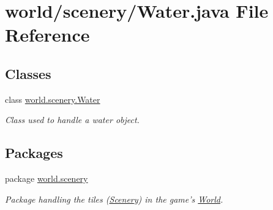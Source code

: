\hypertarget{a00077}{\section{world/scenery/\-Water.java File Reference}
\label{a00077}
}
\subsection*{Classes}
\begin{DoxyCompactItemize}
\item 
class \hyperlink{a00036}{world.\-scenery.\-Water}
\begin{DoxyCompactList}\small\item\em Class used to handle a water object. \end{DoxyCompactList}\end{DoxyCompactItemize}
\subsection*{Packages}
\begin{DoxyCompactItemize}
\item 
package \hyperlink{a00091}{world.\-scenery}
\begin{DoxyCompactList}\small\item\em Package handling the tiles (\hyperlink{a00024}{Scenery}) in the game's \hyperlink{a00039}{World}. \end{DoxyCompactList}\end{DoxyCompactItemize}
